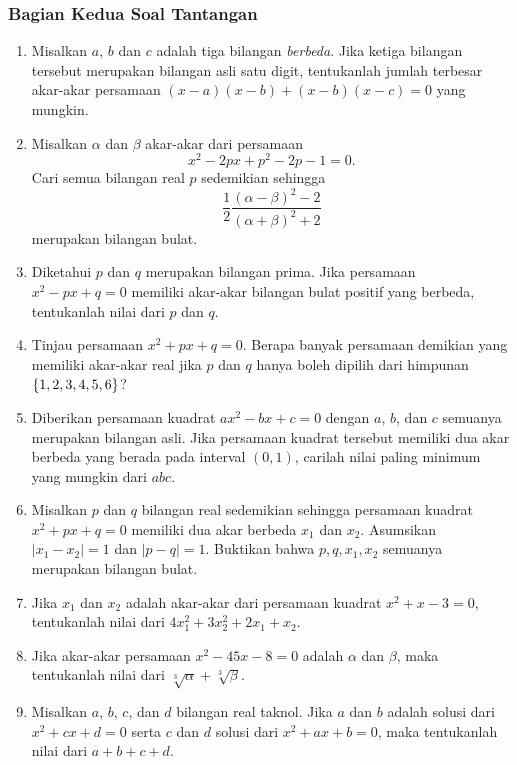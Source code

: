	\subsubsection{Bagian Kedua \dashh Soal Tantangan}
		
		\begin{enumerate}[topsep=0pt]
			\item Misalkan $ a $, $ b $ dan $ c $ adalah tiga bilangan \textit{berbeda}. Jika ketiga bilangan tersebut merupakan bilangan asli satu digit, tentukanlah jumlah terbesar akar-akar persamaan $ \left(x - a\right)\left(x- b\right) + \left(x - b\right)\left(x - c\right) = 0 $ yang mungkin.
			\item Misalkan $ \alpha $ dan $ \beta $ akar-akar dari persamaan
			\[ x^{2} - 2px + p^{2} - 2p - 1 = 0. \]
			Cari semua bilangan real $ p $ sedemikian sehingga
			\[ \frac{1}{2}\frac{\left(\alpha - \beta\right)^{2} - 2}{\left(\alpha + \beta\right)^{2} + 2} \]
			merupakan bilangan bulat.
			\item Diketahui $ p $ dan $ q $ merupakan bilangan prima. Jika persamaan $ x^{2} - px + q = 0 $ memiliki akar-akar bilangan bulat positif yang berbeda, tentukanlah nilai dari $ p $ dan $ q $.
			\item Tinjau persamaan $ x^{2} + px + q = 0 $. Berapa banyak persamaan demikian yang memiliki akar-akar real jika $ p $ dan $ q $ hanya boleh dipilih dari himpunan $ \mathop{}\!\left\lbrace1, 2, 3, 4, 5, 6\right\rbrace $?
			\item Diberikan persamaan kuadrat $ ax^{2} - bx + c = 0 $ dengan $ a $, $ b $, dan $ c $ semuanya merupakan bilangan asli. Jika persamaan kuadrat tersebut memiliki dua akar berbeda yang berada pada interval $ \left(0, 1\right) $, carilah nilai paling minimum yang mungkin dari $ abc $.
			\item {} Misalkan $ p $ dan $ q $ bilangan real sedemikian sehingga persamaan kuadrat $ x^{2} + px + q = 0 $ memiliki dua akar berbeda $ x_{1} $ dan $ x_{2} $. Asumsikan $ \left|x_{1} - x_{2}\right| = 1 $ dan $ \left|p - q\right| = 1 $. Buktikan bahwa $ p, q, x_{1}, x_{2} $ semuanya merupakan bilangan bulat.
			\item Jika $ x_{1} $ dan $ x_{2} $ adalah akar-akar dari persamaan kuadrat $ x^{2} + x - 3 = 0 $, tentukanlah nilai dari $ 4x_{1}^{2} + 3x_{2}^{2} + 2x_{1} + x_{2} $.
			\item Jika akar-akar persamaan $ x^{2} - 45x - 8 = 0 $ adalah $ \alpha $ dan $ \beta $, maka tentukanlah nilai dari $ \sqrt[3]{\alpha} + \sqrt[3]{\beta} $.
			\item Misalkan $ a $, $ b $, $ c $, dan $ d $ bilangan real taknol. Jika $ a $ dan $ b $ adalah solusi dari $ x^{2} + cx + d = 0 $ serta $ c $ dan $ d $ solusi dari $ x^{2} + ax + b = 0 $, maka tentukanlah nilai dari $ a + b + c + d $.

\end{enumerate}
